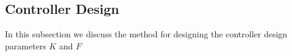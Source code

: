 \subsection{Controller Design}
In this subsection we discuss the method for designing the controller design parameters $K$ and $F$